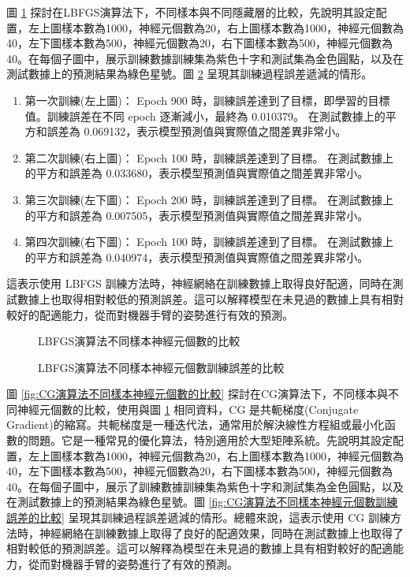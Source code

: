 \documentclass[12pt, a4paper]{article}
\begin{document}
圖 \ref{fig:LBFGS演算法不同樣本神經元個數的比較} 探討在LBFGS演算法下，不同樣本與不同隱藏層的比較，先說明其設定配置，左上圖樣本數為1000，神經元個數為20，右上圖樣本數為1000，神經元個數為40，左下圖樣本數為500，神經元個數為20，右下圖樣本數為500，神經元個數為40。在每個子圖中，展示訓練數據訓練集為紫色十字和測試集為金色圓點，以及在測試數據上的預測結果為綠色星號。圖 \ref{fig:LBFGS演算法不同樣本神經元個數訓練誤差的比較} 呈現其訓練過程誤差遞減的情形。
\begin{enumerate}
\item 第一次訓練(左上圖)：
Epoch 900 時，訓練誤差達到了目標，即學習的目標值。訓練誤差在不同 epoch 逐漸減小，最終為 0.010379。
在測試數據上的平方和誤差為 0.069132，表示模型預測值與實際值之間差異非常小。
\item 第二次訓練(右上圖)：
Epoch 100 時，訓練誤差達到了目標。
在測試數據上的平方和誤差為 0.033680，表示模型預測值與實際值之間差異非常小。
\item 第三次訓練(左下圖)：
Epoch 200 時，訓練誤差達到了目標。
在測試數據上的平方和誤差為 0.007505，表示模型預測值與實際值之間差異非常小。
\item 第四次訓練(右下圖)：
Epoch 100 時，訓練誤差達到了目標。
在測試數據上的平方和誤差為 0.040974，表示模型預測值與實際值之間差異非常小。
\end{enumerate}
這表示使用 LBFGS 訓練方法時，神經網絡在訓練數據上取得良好配適，同時在測試數據上也取得相對較低的預測誤差。這可以解釋模型在未見過的數據上具有相對較好的配適能力，從而對機器手臂的姿勢進行有效的預測。

\begin{figure}[H]
    \caption{LBFGS演算法不同樣本神經元個數的比較}
    \label{fig:LBFGS演算法不同樣本神經元個數的比較}
\end{figure}
\begin{figure}[H]
    \caption{LBFGS演算法不同樣本神經元個數訓練誤差的比較}
    \label{fig:LBFGS演算法不同樣本神經元個數訓練誤差的比較}
\end{figure}

圖 \ref{fig:CG演算法不同樣本神經元個數的比較} 探討在CG演算法下，不同樣本與不同神經元個數的比較，使用與圖 \ref{fig:LBFGS演算法不同樣本神經元個數的比較} 相同資料，CG 是共軛梯度(Conjugate Gradient)的縮寫。共軛梯度是一種迭代法，通常用於解決線性方程組或最小化函數的問題。它是一種常見的優化算法，特別適用於大型矩陣系統。先說明其設定配置，左上圖樣本數為1000，神經元個數為20，右上圖樣本數為1000，神經元個數為40，左下圖樣本數為500，神經元個數為20，右下圖樣本數為500，神經元個數為40。在每個子圖中，展示了訓練數據訓練集為紫色十字和測試集為金色圓點，以及在測試數據上的預測結果為綠色星號。圖 \ref{fig:CG演算法不同樣本神經元個數訓練誤差的比較} 呈現其訓練過程誤差遞減的情形。總體來說，這表示使用 CG 訓練方法時，神經網絡在訓練數據上取得了良好的配適效果，同時在測試數據上也取得了相對較低的預測誤差。這可以解釋為模型在未見過的數據上具有相對較好的配適能力，從而對機器手臂的姿勢進行了有效的預測。
\end{document}
